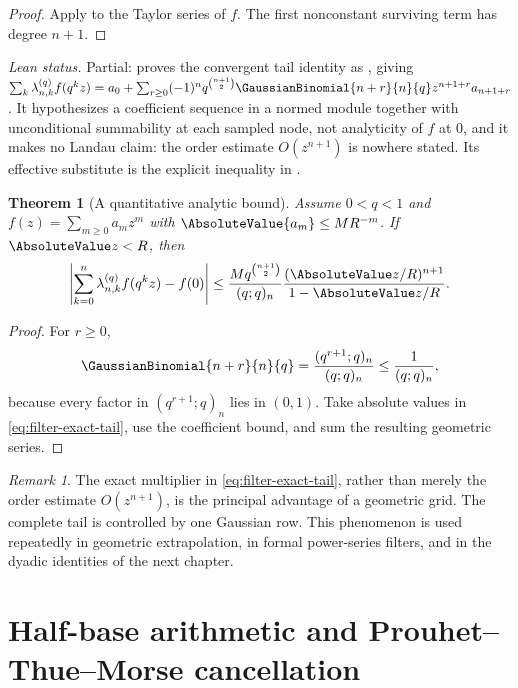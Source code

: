 \documentclass[11pt,a4paper,oneside,openany]{book}
\newtheorem{theorem}{Theorem}[chapter]
\theoremstyle{definition}
\theoremstyle{remark}
\newtheorem{remark}[remark]{Remark}
\begin{document}
\begin{proof}
Apply  to the Taylor series of $f$.  The first nonconstant surviving term has degree $n+1$.
\end{proof}
\emph{Lean status.}  Partial:  proves the convergent tail identity as
, giving
\(\sum_{k}\lambda_{n,k}^{(q)}f(q^kz)=a_0+\sum_{r\ge0}(-1)^nq^{\binom{n+1}{2}}\GaussianBinomial{n+r}{n}{q}z^{n+1+r}a_{n+1+r}\).
It hypothesizes a coefficient sequence in a normed module together with unconditional summability at each sampled node,
not analyticity of \(f\) at \(0\), and it makes no Landau claim: the order estimate \(O(z^{n+1})\) is nowhere stated.
Its effective substitute is the explicit inequality  in .


\begin{theorem}[A quantitative analytic bound]\label{thm:geometric-filter-bound}
Assume $0<q<1$ and
$f(z)=\sum_{m\ge0}a_mz^m$ with
$\AbsoluteValue{a_m}\le M R^{-m}$.  If $\AbsoluteValue z<R$, then
\begin{equation}\label{eq:geometric-filter-bound}
 \left|\sum_{k=0}^{n}\lambda_{n,k}^{(q)}f(q^kz)-f(0)\right|
 \le
 \frac{M q^{\binom{n+1}{2}}}{(q;q)_n}
 \frac{(\AbsoluteValue z/R)^{n+1}}{1-\AbsoluteValue z/R}.
\end{equation}
\end{theorem}

\begin{proof}
For $r\ge0$,
\[
 \GaussianBinomial{n+r}{n}{q}
 =\frac{(q^{r+1};q)_n}{(q;q)_n}
 \le\frac1{(q;q)_n},
\]
because every factor in $(q^{r+1};q)_n$ lies in $(0,1)$.  Take absolute values in \eqref{eq:filter-exact-tail}, use the coefficient bound, and sum the resulting geometric series.
\end{proof}

\begin{remark}
The exact multiplier in \eqref{eq:filter-exact-tail}, rather than merely the order estimate $O(z^{n+1})$, is the principal advantage of a geometric grid.  The complete tail is controlled by one Gaussian row.  This phenomenon is used repeatedly in geometric extrapolation, in formal power-series filters, and in the dyadic identities of the next chapter.
\end{remark}

\chapter{Half-base arithmetic and Prouhet--Thue--Morse cancellation}\label{chap:halfbase-thuemorse}
\end{document}
